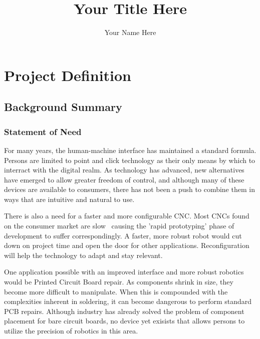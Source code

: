 \documentclass[11pt]{report}
\author{Your Name Here}
\title {Your Title Here}
\let\stdsection\section
\renewcommand\section{\newpage\stdsection}
\begin{document}
\maketitle
\tableofcontents

\chapter*{Project Definition}		%
\setcounter{chapter}{1}			%

\section{Background Summary}

\subsection{Statement of Need}
\par For many years, the human-machine interface has maintained a standard formula. Persons are limited to point and click technology as their only means by which to interract with the digital realm. As technology has advanced, new alternatives have emerged to allow  greater freedom of control, and although many of these devices are available to consumers, there has not been a push to combine them in ways that are intuitive and natural to use.

\par There is also a need for a faster and more configurable CNC. Most CNCs found on the consumer market are slow~ causing the 'rapid prototyping' phase of development to suffer correspondingly. A faster, more robust robot would cut down on project time and open the door for other applications. Reconfiguration will help the technology to adapt and stay relevant.

\par One application possible with an improved interface and more robust robotics would be Printed Circuit Board repair. As components shrink in size, they become more difficult to manipulate. When this is compounded with the complexities inherent in soldering, it can become dangerous to perform standard PCB repairs. Although industry has already solved the problem of component placement for bare circuit boards, no device yet exisists that allows persons to utilize the precision of robotics in this area. 
\end{document}
